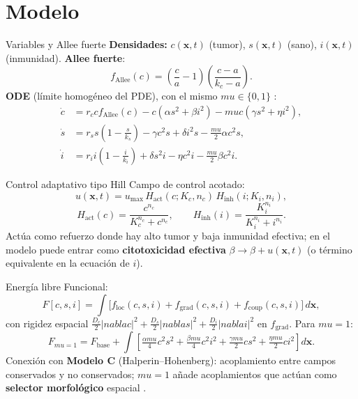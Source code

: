 \documentclass[10pt,aspectratio=169]{beamer}
\def\mu{mu}%
\def\nabla{nabla}%
\begin{document}
\section[Modelo]{Modelo}

\begin{frame}{Variables y Allee fuerte}
  \textbf{Densidades:}\quad
  \textcolor{fieldC}{\(c(\mathbf{x},t)\) (tumor)},\quad
  \textcolor{fieldS}{\(s(\mathbf{x},t)\) (sano)},\quad
  \textcolor{fieldI}{\(i(\mathbf{x},t)\) (inmunidad)}.
  \vfill
  \textbf{Allee fuerte}:
  \[
    f_{\mathrm{Allee}}(c)=\left(\frac{c}{a}-1\right)\left(\frac{c-a}{k_c-a}\right).
  \]
  \vfill
  \textbf{ODE} (límite homogéneo del PDE), con el mismo \(\mu\in\{0,1\}\) \cite{johnson2019allee}:
  \begin{align*}
    \dot{c} &= r_c c f_{\mathrm{Allee}}(c) - c(\alpha s^2 + \beta i^2) - \mu c(\gamma s^2 + \eta i^2),\\
    \dot{s} &= r_s s\left(1-\tfrac{s}{k_s}\right) - \gamma c^2 s + \delta i^2 s - \tfrac{\mu}{2}\alpha c^2 s,\\
    \dot{i} &= r_i i\left(1-\tfrac{i}{k_i}\right) + \delta s^2 i - \eta c^2 i - \tfrac{\mu}{2}\beta c^2 i.
  \end{align*}
\end{frame}

\begin{frame}{Control adaptativo tipo Hill}
  Campo de control acotado:
  \[
    u(\mathbf{x},t)=u_{\max}\,H_{\mathrm{act}}(c;K_c,n_c)\,H_{\mathrm{inh}}(i;K_i,n_i),
  \]
  \[
    H_{\mathrm{act}}(c)=\frac{c^{n_c}}{K_c^{n_c}+c^{n_c}},\qquad
    H_{\mathrm{inh}}(i)=\frac{K_i^{n_i}}{K_i^{n_i}+i^{n_i}}.
  \]
  \justifying
  Actúa como refuerzo donde hay alto tumor y baja inmunidad efectiva; en el modelo puede entrar como \textbf{citotoxicidad efectiva} \(\beta\to \beta+u(\mathbf{x},t)\) (o término equivalente en la ecuación de \(i\)).
\end{frame}

\begin{frame}{Energía libre}
  Funcional:
  \[
    F[c,s,i]=\int \bigl[ f_{\mathrm{loc}}(c,s,i)+f_{\mathrm{grad}}(c,s,i)+f_{\mathrm{coup}}(c,s,i)\bigr]\,d\mathbf{x},
  \]
  con rigidez espacial \(\tfrac{D_c}{2}|\nabla c|^2+\tfrac{D_s}{2}|\nabla s|^2+\tfrac{D_i}{2}|\nabla i|^2\) en \(f_{\mathrm{grad}}\).
  \vfill
  Para \textbf{\(\mu=1\)}:
  \[
    F_{\mu=1}=F_{\mathrm{base}}+\int \left[
      \tfrac{\alpha\mu}{4}c^2s^2+\tfrac{\beta\mu}{4}c^2i^2+\tfrac{\gamma\mu}{2}cs^2+\tfrac{\eta\mu}{2}ci^2
    \right]d\mathbf{x}.
  \]
  \vfill
  \footnotesize Conexión con \textbf{Modelo C} (Halperin--Hohenberg): acoplamiento entre campos conservados y no conservados; \(\mu=1\) añade acoplamientos que actúan como \textbf{selector morfológico} espacial \cite{halperin1977}.
\end{frame}
\end{document}
